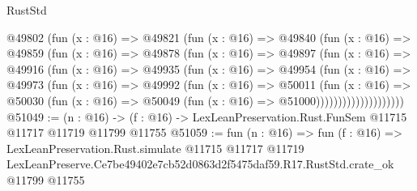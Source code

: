 \begin{lexlean}{RustStd}
\begin{coremodule}
              @49802
                (fun (x : @16) =>
                @49821
                  (fun (x : @16) =>
                  @49840
                    (fun (x : @16) =>
                    @49859
                      (fun (x : @16) =>
                      @49878
                        (fun (x : @16) =>
                        @49897
                          (fun (x : @16) =>
                          @49916
                            (fun (x : @16) =>
                            @49935
                              (fun (x : @16) =>
                              @49954
                                (fun (x : @16) =>
                                @49973
                                  (fun (x : @16) =>
                                  @49992
                                    (fun (x : @16) =>
                                    @50011
                                      (fun (x : @16) =>
                                      @50030
                                        (fun (x : @16) =>
                                        @50049 (fun (x : @16) => @51000))))))))))))))))))))
@51049 := (n : @16) ->
  (f : @16) -> LexLeanPreservation.Rust.FunSem @11715 @11717 @11719 @11799 @11755
@51059 := fun (n : @16) =>
  fun (f : @16) =>
  LexLeanPreservation.Rust.simulate
    @11715
    @11717
    @11719
    LexLeanPreserve.Ce7be49402e7cb52d0863d2f5475daf59.R17.RustStd.crate_ok
    @11799
    @11755
\end{coremodule}
\end{lexlean}
